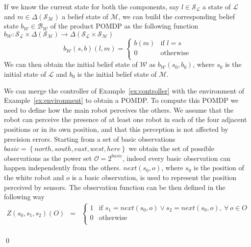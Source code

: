 If we know
the current state for both the components, say $l \in \mathcal{S}_\mathcal{L}$ a state of $\mathcal{L}$ and $m \in \Delta(\mathcal{S}_\mathcal{M})$ a belief state of $\mathcal{M}$, we can build the corresponding belief state $b_{\mathcal{W}} \in \mathcal{B}_\mathcal{W}$ of the product \ac{POMDP} as the following function $b_\mathcal{W} : \mathcal{S}_\mathcal{L} \times \Delta(\mathcal{S}_\mathcal{M}) \rightarrow \Delta(\mathcal{S}_\mathcal{L}\times \mathcal{S}_\mathcal{M})$
\begin{equation*}
b_\mathcal{W}(s,b)(l,m) =  
\begin{cases}
	b(m) & \text{if } l = s \\
	0 & \text{otherwise} \\
\end{cases}
\end{equation*}
%
We can then obtain the initial belief state of $\mathcal{W}$ as $b_{\mathcal{W}}(s_0,b_0)$, where $s_0$ is the initial state of $\mathcal{L}$ and $b_0$ is the initial belief state of $\mathcal{M}$.

\begin{example}\label{ex:pomdp}
We can merge the controller of Example~\ref{ex:controller} with the environment of Example~\ref{ex:environment} to obtain a \ac{POMDP}.
To compute this \ac{POMDP} we need to define how the main robot perceives the others. 
We assume that the robot can perceive the presence of at least one robot in each of the four adjacent positions or in its own position, and that this perception is not affected by precision errors. 
Starting from a set of basic observations $ basic = \left\{north, south, east, west, here \right\} $ we obtain the set of possible observations as the power set $\mathcal{O} = 2^{basic}$, indeed every basic observation can happen independently from the others. $next(s_0,o)$, where $s_0$ is the position of the white robot and $o$ is a basic observation, is used to represent the position perceived by sensors. The observation function can be then defined in the following way
$$
\begin{array}{rcl}
	Z(s_0,s_1,s_2)(O) &=& 
	\begin{cases}
		1 & \text{if } s_1 = next(s_0,o) \vee s_2 = next(s_0,o), \ \forall\ o \in O \\
		0 & \text{otherwise} \\
	\end{cases} \\[.5cm]
\end{array}
$$

\vspace{-.3cm}
\qed
\end{example}

